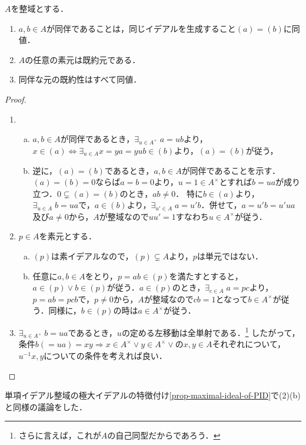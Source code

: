 \documentclass[uplatex,dvipdfmx]{jsreport}
\begin{document}
\begin{lemma}\label{lemma-characterization-of-associatedness-and-prime-is-irreducible}
    $A$を整域とする．
    \begin{enumerate}
        \item $a,b\in A$が同伴であることは，同じイデアルを生成すること$(a)=(b)$に同値．
        \item $A$の任意の素元は既約元である．
        \item 同伴な元の既約性はすべて同値．
    \end{enumerate}
\end{lemma}
\begin{proof}\mbox{}
    \begin{enumerate}
        \item \begin{enumerate}[(a)]
            \item $a,b\in A$が同伴であるとき，$\exists_{u\in A^\times}\;a=ub$より，$x\in(a)\Leftrightarrow \exists_{u\in A}x=ya=yub\in(b)$より，$(a)=(b)$が従う，
            \item 逆に，$(a)=(b)$であるとき，$a,b\in A$が同伴であることを示す．$(a)=(b)=0$ならば$a=b=0$より，$u=1\in A^\times$とすれば$b=ua$が成り立つ．$0\subsetneq(a)=(b)$のとき，$ab\ne 0$．
            特に$b\in(a)$より，$\exists_{u\in A}\;b=ua$で，$a\in(b)$より，$\exists_{u'\in A}\;a=u'b$．併せて，$a=u'b=u'ua$及び$a\ne 0$から，$A$が整域なので$uu'=1$すなわち$u\in A^\times$が従う．
        \end{enumerate}
        \item $p\in A$を素元とする．
        \begin{enumerate}[(a)]
            \item $(p)$は素イデアルなので，$(p)\subsetneq A$より，$p$は単元ではない．
            \item 任意に$a,b\in A$をとり，$p=ab\in(p)$を満たすとすると，$a\in(p)\lor b\in(p)$が従う．$a\in(p)$のとき，$\exists_{c\in A}\;a=pc$より，$p=ab=pcb$で，$p\ne 0$から，$A$が整域なので$cb=1$となって$b\in A^\times$が従う．同様に，$b\in(p)$の時は$a\in A^\times$が従う．
        \end{enumerate}
        \item $\exists_{u\in A^\times}\;b=ua$であるとき，$u$の定める左移動は全単射である．\footnote{さらに言えば，これが$A$の自己同型だからであろう．}
        したがって，条件$b(=ua)=xy\Rightarrow x\in A^\times\lor y\in A^\times\lor$の$x,y\in A$それぞれについて，$u^{-1}x,y$についての条件を考えれば良い．
    \end{enumerate}
\end{proof}
\begin{remarks}
    単項イデアル整域の極大イデアルの特徴付け\ref{prop-maximal-ideal-of-PID}で(2)(b)と同様の議論をした．
\end{remarks}
\end{document}
